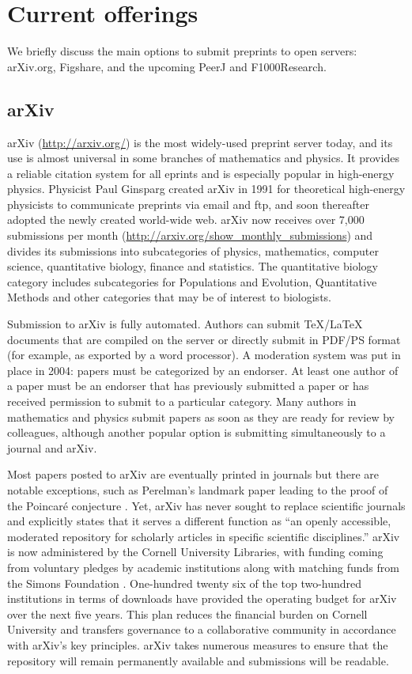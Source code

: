\documentclass[letterpaper,twocolumn,superscriptaddress,showkeys]{revtex4-1}
\begin{document}
\section{Current offerings}

We briefly discuss the main options to submit preprints to open servers:
arXiv.org, Figshare, and the upcoming PeerJ and F1000Research.

\subsection{arXiv}

arXiv (\url{http://arxiv.org/}) is the most widely-used preprint server today,
and its use is almost universal in some branches of mathematics and physics.  It
provides a reliable citation system for all eprints and is especially popular in
high-energy physics. Physicist Paul Ginsparg created arXiv in 1991 for
theoretical high-energy physicists to communicate preprints via email and ftp,
and soon thereafter adopted the newly created world-wide
web\cite{jackson2002preprints}.  arXiv now receives over 7,000 submissions per
month (\url{http://arxiv.org/show_monthly_submissions}) and divides its
submissions into subcategories of physics, mathematics, computer science,
quantitative biology, finance and statistics.  The quantitative biology category
includes subcategories for Populations and Evolution, Quantitative Methods and
other categories that may be of interest to biologists.

Submission to arXiv is fully automated.  Authors can submit \TeX/\LaTeX
documents that are compiled on the server or directly submit in PDF/PS format
(for example, as exported by a word processor).  A moderation system was put in
place in 2004: papers must be categorized by an endorser. At least one
author of a paper must be an endorser that has previously submitted a paper or
has received permission to submit to a particular category.  Many authors in
mathematics and physics submit papers as soon as they are ready for review by
colleagues, although another popular option is submitting simultaneously to a
journal and arXiv.

Most papers posted to arXiv are eventually printed in journals but there are
notable exceptions, such as Perelman's landmark paper leading to the proof of
the Poincar\'{e} conjecture \cite{2002math.....11159P}. Yet, arXiv has never
sought to replace scientific journals and explicitly states that it serves a
different function as ``an openly accessible, moderated repository for scholarly
articles in specific scientific disciplines.'' arXiv is now administered by the
Cornell University Libraries, with funding coming from voluntary pledges by academic
institutions along with matching funds from the Simons Foundation
\cite{arxiv_future}.  One-hundred twenty six of the top two-hundred institutions
in terms of downloads have provided the operating budget for arXiv over the next
five years.  This plan reduces the financial burden on Cornell University and
transfers governance to a collaborative community in accordance with arXiv's key
principles.  arXiv takes numerous measures to ensure that the repository will
remain permanently available and submissions will be readable.
\end{document}
